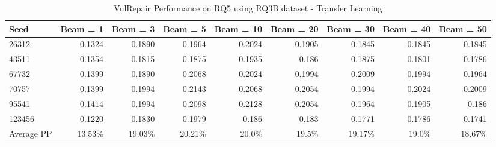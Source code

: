 %
%
%
\begin{table}[H]
\centering
  \caption{VulRepair Performance on RQ5 using RQ3B dataset - Transfer Learning}
  \label{Appendices:RQ5-finetrain-VulRepair}
  \begin{tabular}{|l|r|r|r|r|r|r|r|r|}
    \hline
    Seed          & Beam = 1               & Beam = 3           & Beam = 5            & Beam = 10   & Beam = 20     & Beam = 30     & Beam = 40     & Beam = 50\\
    \hline
    26312          & 0.1324                 & 0.1890             & 0.1964             & 0.2024      & 0.1905        & 0.1845        & 0.1845        & 0.1845 \\
    \hline
    43511          & 0.1354                 & 0.1815             & 0.1875             & 0.1935      & 0.186         & 0.1875        & 0.1801        & 0.1786 \\
    \hline
    67732          & 0.1399                 & 0.1890             & 0.2068             & 0.2024      & 0.1994        & 0.2009        & 0.1994        & 0.1964 \\
    \hline
    70757          & 0.1399                 & 0.1994             & 0.2143             & 0.2068      & 0.2054        & 0.1994        & 0.2024        & 0.2009 \\
    \hline
    95541          & 0.1414                 & 0.1994             & 0.2098             & 0.2128      & 0.2054        & 0.1964        & 0.1905        & 0.186 \\
    \hline
    123456         & 0.1220                 & 0.1830             & 0.1979             & 0.186       & 0.183         & 0.1771        & 0.1786        & 0.1741 \\
    \hline
    Average PP     & 13.53\%                & 19.03\%            & 20.21\%            & 20.0\%      & 19.5\%        & 19.17\%       & 19.0\%        & 18.67\%  \\
    \hline
  \end{tabular}
\end{table}
%
%
%
